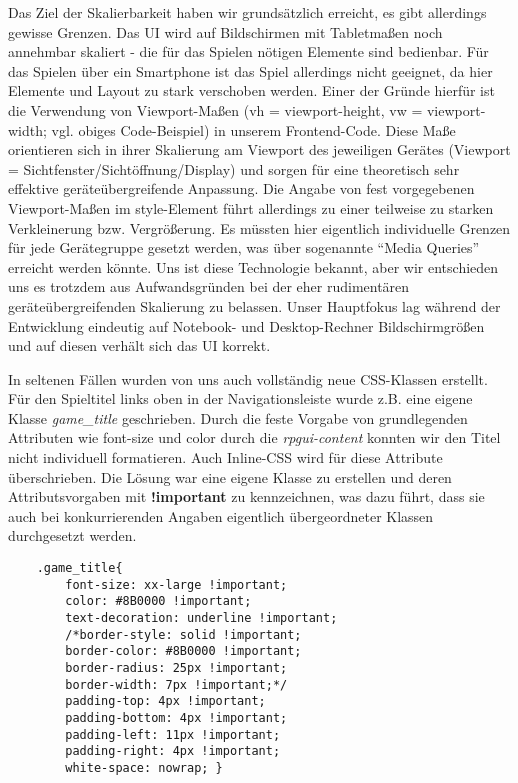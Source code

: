 Das Ziel der Skalierbarkeit haben wir grundsätzlich erreicht, es gibt allerdings gewisse Grenzen. Das UI wird auf Bildschirmen mit Tabletmaßen noch annehmbar skaliert - die für das Spielen nötigen Elemente sind bedienbar. Für das Spielen über ein Smartphone ist das Spiel allerdings nicht geeignet, da hier Elemente und Layout zu stark verschoben werden. Einer der Gründe hierfür ist die Verwendung von Viewport-Maßen (vh = viewport-height, vw = viewport-width; vgl. obiges Code-Beispiel) in unserem Frontend-Code. Diese Maße orientieren sich in ihrer Skalierung am Viewport des jeweiligen Gerätes (Viewport = Sichtfenster/Sichtöffnung/Display) und sorgen für eine theoretisch sehr effektive geräteübergreifende Anpassung. Die Angabe von fest vorgegebenen Viewport-Maßen im style-Element führt allerdings zu einer teilweise zu starken Verkleinerung bzw. Vergrößerung. Es müssten hier eigentlich individuelle Grenzen für jede Gerätegruppe gesetzt werden, was über sogenannte \enquote{Media Queries} erreicht werden könnte. Uns ist diese Technologie bekannt, aber wir entschieden uns es trotzdem aus Aufwandsgründen bei der eher rudimentären geräteübergreifenden Skalierung zu belassen. Unser Hauptfokus lag während der Entwicklung eindeutig auf Notebook- und Desktop-Rechner Bildschirmgrößen und auf diesen verhält sich das UI korrekt.

In seltenen Fällen wurden von uns auch vollständig neue CSS-Klassen erstellt. Für den Spieltitel links oben in der Navigationsleiste wurde z.B. eine eigene Klasse \textit{game\_title} geschrieben. Durch die feste Vorgabe von grundlegenden Attributen wie font-size und color durch die \textit{rpgui-content} konnten wir den Titel nicht individuell formatieren. Auch Inline-CSS wird für diese Attribute überschrieben. Die Lösung war eine eigene Klasse zu erstellen und deren Attributsvorgaben mit \textbf{!important} zu kennzeichnen, was dazu führt, dass sie auch bei konkurrierenden Angaben eigentlich übergeordneter Klassen durchgesetzt werden.

\begin{lstlisting}
    .game_title{
        font-size: xx-large !important;
        color: #8B0000 !important;
        text-decoration: underline !important;
        /*border-style: solid !important;
        border-color: #8B0000 !important;
        border-radius: 25px !important;
        border-width: 7px !important;*/
        padding-top: 4px !important;
        padding-bottom: 4px !important;
        padding-left: 11px !important;
        padding-right: 4px !important;
        white-space: nowrap; }
\end{lstlisting}




    